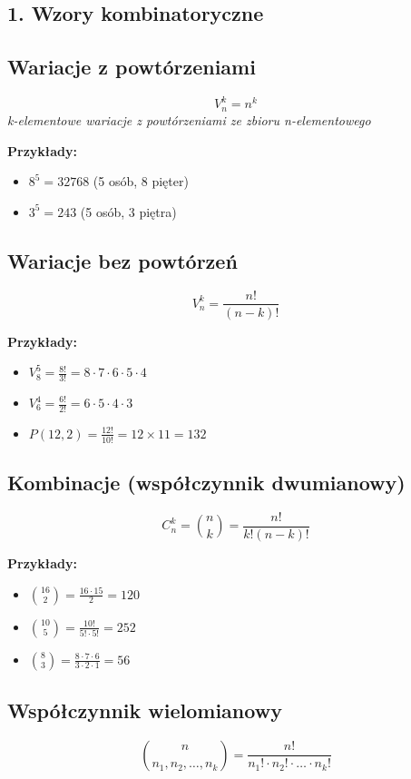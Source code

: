 \documentclass[10pt,a4paper]{article}
\begin{document}
\begin{multicols}{2}

\section*{1. Wzory kombinatoryczne}

\subsection*{Wariacje z powtórzeniami}
$$V_n^k = n^k$$
\textit{k-elementowe wariacje z powtórzeniami ze zbioru n-elementowego}

\textbf{Przykłady:}
\begin{itemize}
\item $8^5 = 32768$ (5 osób, 8 pięter)
\item $3^5 = 243$ (5 osób, 3 piętra)
\end{itemize}

\subsection*{Wariacje bez powtórzeń}
$$V_n^k = \frac{n!}{(n-k)!}$$

\textbf{Przykłady:}
\begin{itemize}
\item $V_8^5 = \frac{8!}{3!} = 8 \cdot 7 \cdot 6 \cdot 5 \cdot 4$
\item $V_6^4 = \frac{6!}{2!} = 6 \cdot 5 \cdot 4 \cdot 3$
\item $P(12,2) = \frac{12!}{10!} = 12 \times 11 = 132$
\end{itemize}

\subsection*{Kombinacje (współczynnik dwumianowy)}
$$C_n^k = \binom{n}{k} = \frac{n!}{k!(n-k)!}$$

\textbf{Przykłady:}
\begin{itemize}
\item $\binom{16}{2} = \frac{16 \cdot 15}{2} = 120$
\item $\binom{10}{5} = \frac{10!}{5! \cdot 5!} = 252$
\item $\binom{8}{3} = \frac{8 \cdot 7 \cdot 6}{3 \cdot 2 \cdot 1} = 56$
\end{itemize}

\subsection*{Współczynnik wielomianowy}
$$\binom{n}{n_1, n_2, \ldots, n_k} = \frac{n!}{n_1! \cdot n_2! \cdot \ldots \cdot n_k!}$$


\end{multicols}
\end{document}
